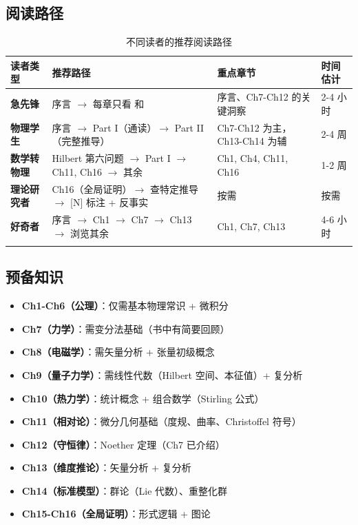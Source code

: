 \subsection{阅读路径}

\begin{center}
\small
\begin{longtable}{p{2.5cm}p{4cm}p{4cm}p{3.5cm}}
\toprule
\textbf{读者类型} & \textbf{推荐路径} & \textbf{重点章节} & \textbf{时间估计} \\
\midrule
\textbf{急先锋} & 序言 $\to$ 每章只看 \keypoint{} 和 \bridge{} & 序言、Ch7-Ch12 的关键洞察 & 2-4 小时 \\
\textbf{物理学生} & 序言 $\to$ Part I（通读）$\to$ Part II（完整推导） & Ch7-Ch12 为主，Ch13-Ch14 为辅 & 2-4 周 \\
\textbf{数学转物理} & Hilbert 第六问题 $\to$ Part I $\to$ Ch11, Ch16 $\to$ 其余 & Ch1, Ch4, Ch11, Ch16 & 1-2 周 \\
\textbf{理论研究者} & Ch16（全局证明）$\to$ 查特定推导 $\to$ [N] 标注 + 反事实 & 按需 & 按需 \\
\textbf{好奇者} & 序言 $\to$ Ch1 $\to$ Ch7 $\to$ Ch13 $\to$ 浏览其余 \keypoint{} & Ch1, Ch7, Ch13 & 4-6 小时 \\
\bottomrule
\caption{不同读者的推荐阅读路径}
\end{longtable}
\end{center}

\subsection{预备知识}

\begin{itemize}
  \item \textbf{Ch1-Ch6（公理）}：仅需基本物理常识 + 微积分
  \item \textbf{Ch7（力学）}：需变分法基础（书中有简要回顾）
  \item \textbf{Ch8（电磁学）}：需矢量分析 + 张量初级概念
  \item \textbf{Ch9（量子力学）}：需线性代数（Hilbert 空间、本征值）+ 复分析
  \item \textbf{Ch10（热力学）}：统计概念 + 组合数学（Stirling 公式）
  \item \textbf{Ch11（相对论）}：微分几何基础（度规、曲率、Christoffel 符号）
  \item \textbf{Ch12（守恒律）}：Noether 定理（Ch7 已介绍）
  \item \textbf{Ch13（维度推论）}：矢量分析 + 复分析
  \item \textbf{Ch14（标准模型）}：群论（Lie 代数）、重整化群
  \item \textbf{Ch15-Ch16（全局证明）}：形式逻辑 + 图论
\end{itemize}


